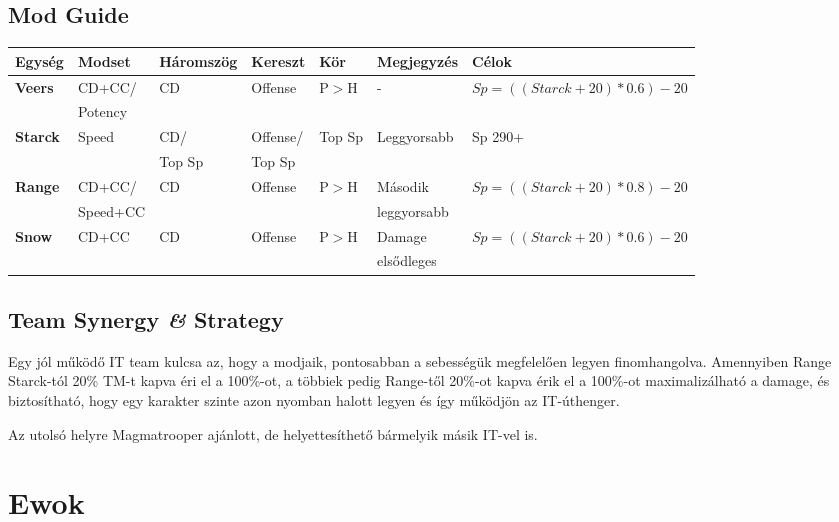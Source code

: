 \documentclass[11pt]{report}
\begin{document}
\section{Mod Guide}
\begin{center}
    \begin{tabular}{|l | l | l | l | l | l | l |}
        \hline
        Egység & Modset & Háromszög & Kereszt & Kör & Megjegyzés & Célok\\ \hline
        \textbf{Veers} & CD+CC/ & CD & Offense & P$>$H & - & $Sp = ((Starck+20)*0.6)-20$\\
        & Potency &  &  &  &  & \\ \hline
        \textbf{Starck} & Speed & CD/ & Offense/ & Top Sp & Leggyorsabb & Sp 290+\\
        &  & Top Sp & Top Sp &  &  & \\ \hline
        \textbf{Range} & CD+CC/ & CD & Offense & P$>$H & Második & $Sp = ((Starck+20)*0.8)-20$\\
        & Speed+CC &  &  &  & leggyorsabb & \\ \hline
        \textbf{Snow} & CD+CC & CD & Offense & P$>$H & Damage & $Sp = ((Starck+20)*0.6)-20$\\
        &  &  &  &  & elsődleges & \\ \hline
    \end{tabular}
\end{center}
\section{Team Synergy \textit{\&} Strategy}
Egy jól működő IT team kulcsa az, hogy a modjaik, pontosabban a sebességük megfelelően legyen finomhangolva. Amennyiben Range Starck-tól 20\% TM-t kapva éri el a 100\%-ot, a többiek pedig Range-től 20\%-ot kapva érik el a 100\%-ot maximalizálható a damage, és biztosítható, hogy egy karakter szinte azon nyomban halott legyen és így működjön az IT-úthenger.\par
Az utolsó helyre Magmatrooper ajánlott, de helyettesíthető bármelyik másik IT-vel is.


\chapter{Ewok}
\end{document}
